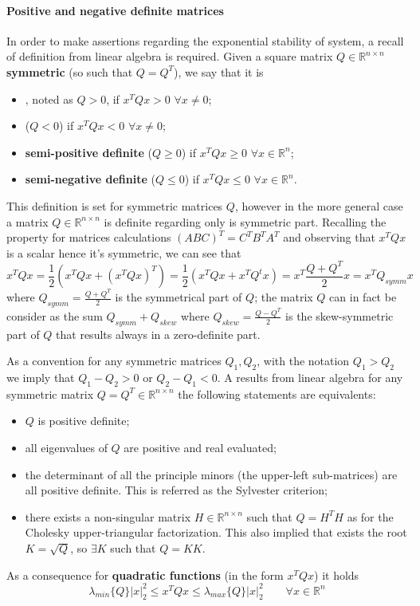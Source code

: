 		\paragraph{Positive and negative definite matrices} In order to make assertions regarding the exponential stability of system, a recall of definition from linear algebra is required. Given a square matrix $Q\in \mathds R^{n\times n}$ \textbf{symmetric} (so such that $Q=Q^T$), we say that it is
		\begin{itemize}
			\item {}, noted as $Q>0$, if  $x^TQx > 0$ $\forall x\neq 0$;
			\item {} ($Q<0$) if  $x^TQx < 0$ $\forall x\neq 0$;
			\item \textbf{semi-positive definite} ($Q\geq0$) if  $x^TQx \geq 0$ $\forall x \in \mathds R^n$;
			\item \textbf{semi-negative definite} ($Q\leq0$) if  $x^TQx \leq 0$ $\forall x \in \mathds R^n$.
		\end{itemize}
		\begin{note}
			This definition is set for symmetric matrices $Q$, however in the more general case a matrix $Q\in \mathds R^{n\times n}$ is definite regarding only is symmetric part. Recalling the property for matrices calculations $(ABC)^T = C^TB^TA^T$ and observing that $x^T Q x$ is a scalar hence it's symmetric, we can see that
			\[ x^TQx = \frac 1 2 \left( x^TQx + (x^TQx)^T \right) = \frac 1 2 \left( x^T Qx + x^T Q^t x \right) = x^T \frac{Q+ Q^T}{2} x = x^T Q_{symm} x \]
			where $Q_{symm} = \frac{Q+Q^T}{2}$ is the symmetrical part of $Q$; the matrix $Q$ can in fact be consider as the sum $Q_{symm} + Q_{skew}$ where $Q_{skew} = \frac{Q-Q^T}2$ is the skew-symmetric part of $Q$ that results always in a zero-definite part.
		\end{note}
	
		As a convention for any symmetric matrices $Q_1,Q_2$, with the notation $Q_1 > Q_2$ we imply that $Q_1-Q_2 >0$ or $Q_2-Q_1 < 0$. A results from linear algebra for any symmetric matrix $Q= Q^T\in \mathds R^{n\times n}$ the following statements are equivalents:
		\begin{itemize}
			\item $Q$ is positive definite;
			\item all eigenvalues of $Q$ are positive and real evaluated;
			\item the determinant of all the principle minors (the upper-left sub-matrices) are all positive definite. This is referred as the Sylvester criterion;
			\item there exists a non-singular matrix $H\in \mathds R^{n\times n}$ such that $Q= H^TH$ as for the Cholesky upper-triangular factorization. This also implied that exists the root $K=\sqrt Q$, so $\exists K$ such that $Q = K K$.
		\end{itemize}
		As a consequence for \textbf{quadratic functions} (in the form $x^TQx$) it holds
		\begin{equation} \label{eq:lin:sandwich}
			\lambda_{min}\{ Q \} |x|^2_2 \leq x^T Q x \leq \lambda_{max} \{Q\} |x|_2^2 \qquad \forall x \in \mathds R^n
		\end{equation}
		

